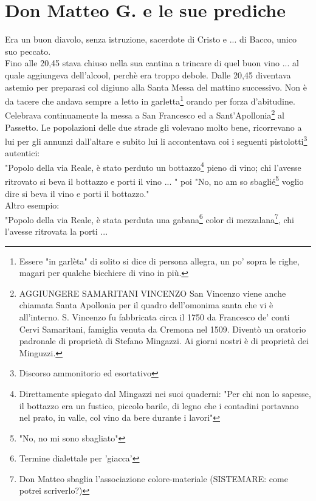 \documentclass[10pt]{memoir} %
\begin{document}

\chapter{Don Matteo G. e le sue prediche}
Era un buon diavolo, senza istruzione, sacerdote di Cristo e ... di Bacco, unico suo peccato.\\
Fino alle 20,45 stava chiuso nella sua cantina a trincare di quel buon vino ... al quale aggiungeva dell'alcool, perchè era troppo debole. Dalle 20,45 diventava astemio per preparasi col digiuno alla Santa Messa del mattino successivo. Non è da tacere che andava sempre a letto in garletta\footnote{Essere "in garlèta" di solito si dice di persona allegra, un po' sopra le righe, magari per qualche bicchiere di vino in più.} orando per forza d'abitudine. \\ Celebrava continuamente la messa a San Francesco ed a Sant'Apollonia\footnote{AGGIUNGERE SAMARITANI VINCENZO San Vincenzo viene anche chiamata Santa Apollonia per il quadro dell'omonima santa che vi è all'interno. S. Vincenzo fu fabbricata circa il 1750 da Francesco de' conti Cervi Samaritani, famiglia venuta da Cremona nel 1509. Diventò un oratorio padronale di proprietà di Stefano Mingazzi. Ai giorni nostri è di proprietà dei Minguzzi.} al Passetto. Le popolazioni delle due strade gli volevano molto bene, ricorrevano a lui per gli annunzi dall'altare e subito lui li accontentava coi i seguenti pistolotti\footnote{Discorso ammonitorio ed esortativo} autentici:\\
"Popolo della via Reale, è stato perduto un bottazzo\footnote{Direttamente spiegato dal Mingazzi nei suoi quaderni: "Per chi non lo sapesse, il bottazzo era un fustico, piccolo barile, di legno che i contadini portavano nel prato, in valle, col vino da bere durante i lavori"} pieno di vino; chi l'avesse ritrovato si beva il bottazzo e porti il vino ... " poi "No, no am so sbaglié\footnote{"No, no mi sono sbagliato"} voglio dire si beva il vino e porti il bottazzo."\\
Altro esempio:\\
"Popolo della via Reale, è stata perduta una gabana\footnote{Termine dialettale per 'giacca'} color di mezzalana\footnote{Don Matteo sbaglia l'associazione colore-materiale (SISTEMARE: come potrei scriverlo?)}, chi l'avesse ritrovata la porti ...\\
\end{document}
